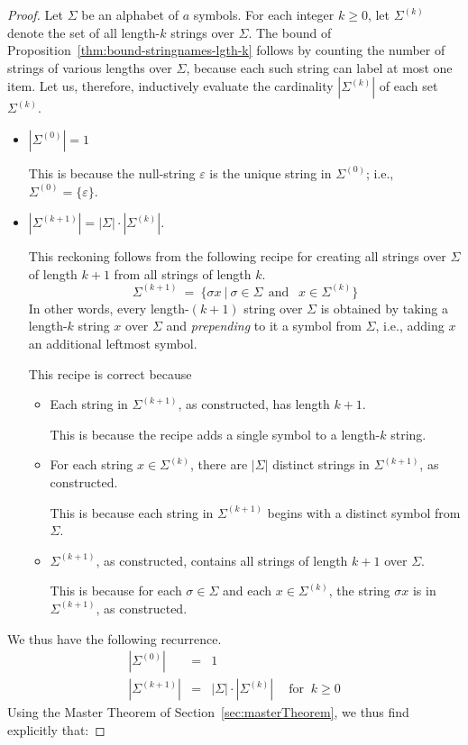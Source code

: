 \begin{proof}
Let $\Sigma$ be an alphabet of $a$ symbols.  For each integer $k \geq
0$, let $\Sigma^{(k)}$ denote the set of all length-$k$ strings over
$\Sigma$.  The bound of Proposition~\ref{thm:bound-stringnames-lgth-k}
follows by counting the number of strings of various lengths over
$\Sigma$, because each such string can label at most one item.  Let
us, therefore, inductively evaluate the cardinality $|\Sigma^{(k)}|$
of each set $\Sigma^{(k)}$.
\begin{itemize}
\item
$|\Sigma^{(0)}| =1$

This is because the null-string $\varepsilon$  
is the unique string in $\Sigma^{(0)}$; i.e., $\Sigma^{(0)} = \{
\varepsilon \}$.

\item
$|\Sigma^{(k+1)}| = |\Sigma| \cdot |\Sigma^{(k)}|$.

This reckoning follows from the following recipe for creating all
strings over $\Sigma$ of length $k+1$ from all strings of length $k$.
\[
\Sigma^{(k+1)} \ = \ \{ \sigma x \ | \ \sigma \in \Sigma \ \ \mbox{
  and } \ \ x \in \Sigma^{(k)} \}
\]
In other words, every length-$(k+1)$ string over $\Sigma$ is obtained
by taking a length-$k$ string $x$ over $\Sigma$ and {\em prepending}
 to it a symbol from $\Sigma$,
i.e., adding $x$ an additional leftmost symbol.

This recipe is correct because
  \begin{itemize}
  \item
Each string in $\Sigma^{(k+1)}$, as constructed, has length $k+1$.

This is because the recipe adds a single symbol to a length-$k$
string.
  \item
For each string $x \in \Sigma^{(k)}$, there are $|\Sigma|$ distinct
strings in $\Sigma^{(k+1)}$, as constructed.

This is because each string in $\Sigma^{(k+1)}$ begins with a distinct
symbol from $\Sigma$.

  \item
$\Sigma^{(k+1)}$, as constructed, contains all strings of length $k+1$
over $\Sigma$.

This is because for each $\sigma \in \Sigma$ and each $x \in
\Sigma^{(k)}$, the string $\sigma x$ is in $\Sigma^{(k+1)}$, as
constructed.
  \end{itemize}
\end{itemize}
We thus have the following recurrence.
\begin{eqnarray*}
|\Sigma^{(0)}| & = & 1 \\
|\Sigma^{(k+1)}| & = & |\Sigma| \cdot |\Sigma^{(k)}| \ \ \ \ 
\mbox{ for } \ k \geq 0
\end{eqnarray*}
Using the Master Theorem of Section~\ref{sec:masterTheorem}, we thus
find explicitly that:


\end{proof}
